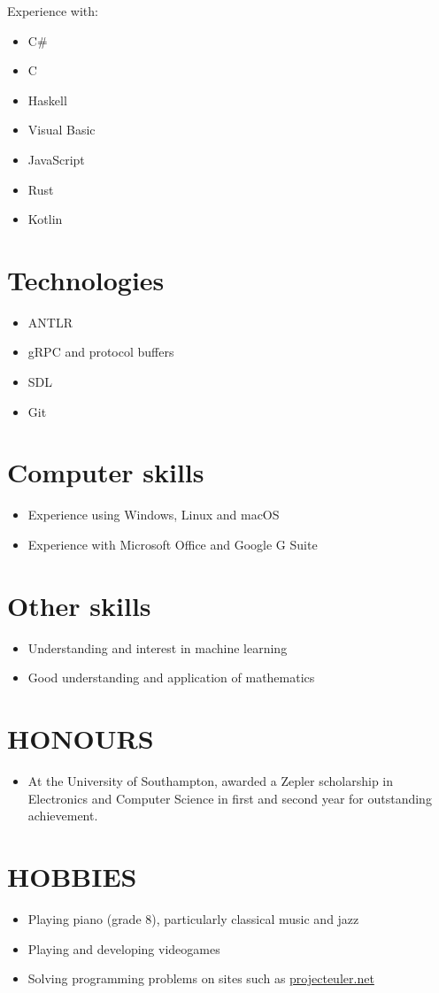 \documentclass[margin]{res}
\begin{document}
\begin{resume}
\begin{samepage}
Experience with:
\begin{itemize}
\item C\#
\item C
\item Haskell
\item Visual Basic
\item JavaScript
\item Rust
\item Kotlin
\end{itemize}
\end{samepage}

\normalsize{\section{Technologies}}
\begin{itemize}
\item ANTLR
\item gRPC and protocol buffers
\item SDL
\item Git
\end{itemize}

\normalsize{\section{Computer skills}}
\begin{itemize}
\item Experience using Windows, Linux and macOS
\item Experience with Microsoft Office and Google G Suite
\end{itemize}

\normalsize{\section{Other skills}}
\begin{itemize}
\item Understanding and interest in machine learning
\item Good understanding and application of mathematics
\end{itemize}

\section{HONOURS}
\begin{itemize}
\item At the University of Southampton, awarded a Zepler scholarship in
Electronics and Computer Science in first and second year for outstanding
achievement.
\end{itemize}

\section{HOBBIES}
\begin{itemize}
\item Playing piano (grade 8), particularly classical music and jazz
\item Playing and developing videogames
\item Solving programming problems on sites such as
\href{https://projecteuler.net/}{projecteuler.net}
\end{itemize}

\end{resume}
\end{document}
